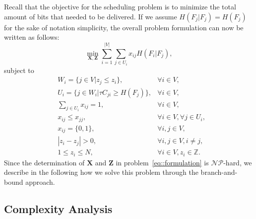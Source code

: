 Recall that the objective for the scheduling problem is to minimize the total amount of bits that needed to be delivered.
If we assume $H(F_j|F_j) = H(F_j)$ for the sake of notation simplicity, the overall problem formulation can now be written as follows:
\begin{equation*}
\underset{\mathbf{X}, \mathbf{Z}}{\min}
\sum_{i=1}^{|V|} \sum_{j \in U_i}  x_{ij} H(F_i|F_j),
\end{equation*}
subject to
\begin{align}
&W_i = \{ j \in V | z_j \leq z_i \}, &\forall i \in V, \nonumber \\
&U_i = \{ j \in W_i | \tau C_{ji} \geq H(F_j) \}, &\forall i \in V, \nonumber \\
&\sum_{j \in U_i} x_{ij} = 1, &\forall i \in V, \nonumber \\
&x_{ij} \leq x_{jj}, &\forall i \in V, \forall j \in U_i, \nonumber \\
&x_{ij} = \{0,1\}, &\forall i,j \in V, \nonumber \\
&|z_i - z_j| > 0, &\forall i,j \in V, i \neq j, \nonumber \\
&1 \leq z_i \leq N, &\forall i \in V, z_i \in \mathbb{Z}.
\label{eq::formulation}
\end{align}
Since the determination of $\mathbf{X}$ and $\mathbf{Z}$ in problem~\eqref{eq::formulation} is $\mathcal{NP}$-hard, we describe in the following how we solve this problem through the branch-and-bound approach.
%
\subsection{Complexity Analysis}